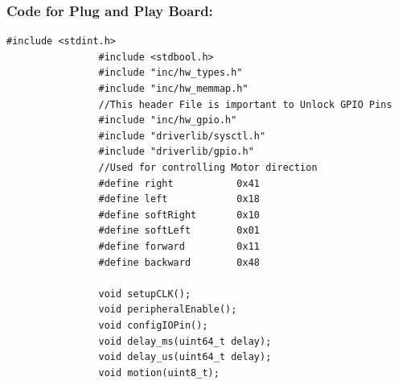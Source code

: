 \documentclass[a4paper,12pt,oneside]{article}
\begin{document}
			\subsubsection{\textbf{Code for Plug and Play Board:}}
			\begin{lstlisting}[style=CStyle]
				#include <stdint.h>
				#include <stdbool.h>
				#include "inc/hw_types.h"
				#include "inc/hw_memmap.h"
				//This header File is important to Unlock GPIO Pins
				#include "inc/hw_gpio.h"
				#include "driverlib/sysctl.h"
				#include "driverlib/gpio.h"
				//Used for controlling Motor direction
				#define right           0x41
				#define left            0x18
				#define softRight       0x10
				#define softLeft        0x01
				#define forward         0x11
				#define backward        0x48
				
				void setupCLK();
				void peripheralEnable();
				void configIOPin();
				void delay_ms(uint64_t delay);
				void delay_us(uint64_t delay);
				void motion(uint8_t);
				

\end{lstlisting}
\end{document}
